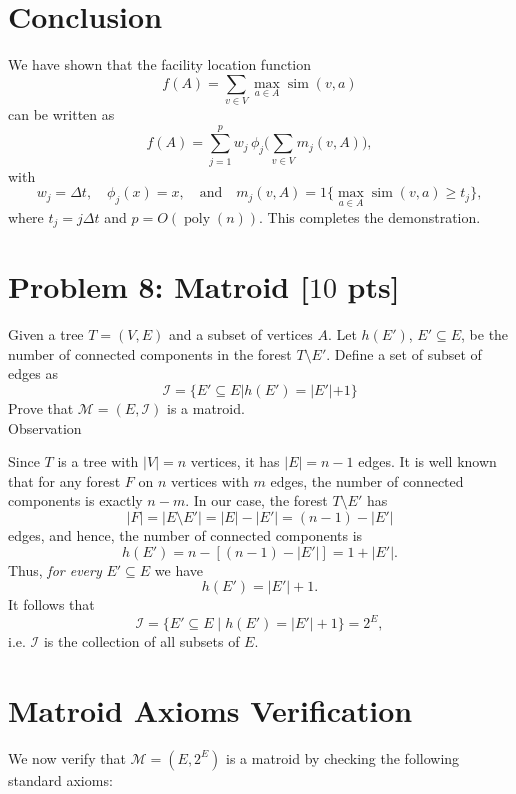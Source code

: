 \documentclass[letterpaper, 11pt]{article}
\newcommand{\1}{\mathds{1}}	%
\theoremstyle{definition}
\newcommand{\problem}[1]{\section*{Problem #1}}
\newenvironment{solution}{{\par\noindent\it Solution.}}{}
\begin{document}
\begin{solution}
\section*{Conclusion}

We have shown that the facility location function
\[
f(A)=\sum_{v\in V}\max_{a\in A}\operatorname{sim}(v,a)
\]
can be written as
\[
f(A)=\sum_{j=1}^{p}w_j\,\phi_j\Biggl(\sum_{v\in V} m_j(v,A)\Biggr),
\]
with 
\[
w_j=\Delta t,\quad \phi_j(x)=x,\quad \text{and}\quad m_j(v,A)=1\Big\{\max_{a\in A}\operatorname{sim}(v,a)\ge t_j\Big\},
\]
where \(t_j=j\Delta t\) and \(p=O(\operatorname{poly}(n))\). This completes the demonstration.
\end{solution}
\clearpage


\problem{8: Matroid [$10$ pts]}
Given a tree $T = (V, E)$ and a subset of vertices $A$. Let $h(E')$, $E' \subseteq E$, be the number of connected components in the forest $T \setminus E'$. Define a set of subset of edges as 
$$\mathcal{I} = \{E' \subseteq E | h(E') = |E'| + 1\}$$
Prove that $\mathcal{M} = (E,\mathcal{I})$ is a matroid.
\\
Observation

Since \(T\) is a tree with \(|V|=n\) vertices, it has \(|E|=n-1\) edges. It is well known that for any forest \(F\) on \(n\) vertices with \(m\) edges, the number of connected components is exactly \(n-m\). In our case, the forest \(T\setminus E'\) has
\[
|F|=|E\setminus E'|=|E|-|E'|=(n-1)-|E'|
\]
edges, and hence, the number of connected components is
\[
h(E')=n-\left[(n-1)-|E'|\right] = 1+|E'|.
\]
Thus, \emph{for every} \(E'\subseteq E\) we have
\[
h(E')=|E'|+1.
\]
It follows that
\[
\mathcal{I}=\{E'\subseteq E \mid h(E')=|E'|+1\} = 2^E,
\]
i.e. \(\mathcal{I}\) is the collection of all subsets of \(E\).

\section*{Matroid Axioms Verification}

We now verify that \(\mathcal{M}=(E,2^E)\) is a matroid by checking the following standard axioms:
\end{document}
